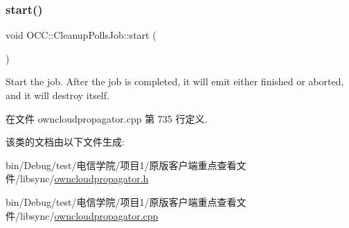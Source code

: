 \mbox{\label{class_o_c_c_1_1_cleanup_polls_job_aa2a5050d296eb47434ad9627f162e8aa}} 
\subsubsection{\texorpdfstring{start()}{start()}}
{\footnotesize\ttfamily void O\+C\+C\+::\+Cleanup\+Polls\+Job\+::start (\begin{DoxyParamCaption}{ }\end{DoxyParamCaption})}

Start the job. After the job is completed, it will emit either finished or aborted, and it will destroy itself. 

在文件 owncloudpropagator.\+cpp 第 735 行定义.



该类的文档由以下文件生成\+:\begin{DoxyCompactItemize}
\item 
bin/\+Debug/test/电信学院/项目1/原版客户端重点查看文件/libsync/\hyperlink{owncloudpropagator_8h}{owncloudpropagator.\+h}\item 
bin/\+Debug/test/电信学院/项目1/原版客户端重点查看文件/libsync/\hyperlink{owncloudpropagator_8cpp}{owncloudpropagator.\+cpp}\end{DoxyCompactItemize}
